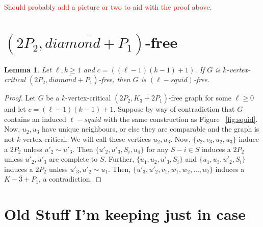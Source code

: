 \documentclass[11pt]{article}
\newtheorem{lemma}[theorem]{Lemma}
\theoremstyle{definition}
\begin{document}
\textcolor{red}{Should probably add a picture or two to aid with the proof above.}

\section{$(2P_2, \overline{diamond + P_1})$-free}

\begin{lemma}\label{lem:compdiamondplusP1}
Let $\ell,k\ge 1$ and $c=((\ell-1)(k-1)+1)$. If $G$ is $k$-vertex-critical $(2P_2, \overline{diamond+P_1})$-free, then $G$ is $(\ell-squid)$-free.
\end{lemma}
\begin{proof}
Let $G$ be a $k$-vertex-critical $(2P_2, \overline{K_3 + 2P_1})$-free graph for some $\ell \ge 0$ and let $c = (\ell - 1)(k - 1) + 1$. Suppose by way of contradiction that $G$ contains an induced $\ell-squid$ with the same construction as Figure ~\ref{fig:squid}. Now, $u_2, u_3$ have unique neighbours, or else they are comparable and the graph is not $k$-vertex-critical. We will call these vertices $u_2, u_3$. Now, $\{ v_2, v_3, u_2, u_3 \}$ induce a $2P_2$ unless $u'_2 \sim u'_3$. Then $\{ u'_2, u'_3, S_i, u_4 \}$ for any $S-i \in S$ induces a $2P_2$ unless $u'_2, u'_3$ are complete to $S$. Further, $\{ u_1, u_2, u'_3, S_i \}$ and $\{ u_1, u_3, u'_2, S_i \}$ induces a $2P_2$ unless $u'_3, u'_2 \sim u_1$. Then, $\{ u'_3, u'_2, v_1, w_1, w_2, \dots, w_l \}$ induces a $\overline{K-3 + P_1}$, a contradiction.
\end{proof}

\section{Old Stuff I'm keeping just in case}
\end{document}
